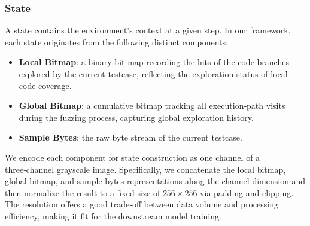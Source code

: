 \documentclass[lettersize,journal]{IEEEtran}
\begin{document}
\subsubsection{State}\label{subsubsec:state}
A state contains the environment’s context at a given step. In our framework, each state originates from the following distinct components:
\begin{itemize}
	\item \textbf{Local Bitmap}: a binary bit map recording the hits of the code branches explored by the current testcase, reflecting the exploration status of local code coverage.
	\item \textbf{Global Bitmap}: a cumulative bitmap tracking all execution‑path visits during the fuzzing process, capturing global exploration history.
	\item \textbf{Sample Bytes}: the raw byte stream of the current testcase.
\end{itemize}
We encode each component for state construction as one channel of a three‑channel grayscale image. Specifically, we concatenate the local bitmap, global bitmap, and sample‑bytes representations along the channel dimension and then normalize the result to a fixed size of $256\times256$ via padding and clipping. The resolution offers a good trade‑off between data volume and processing efficiency, making it fit for the downstream model training.
\end{document}
